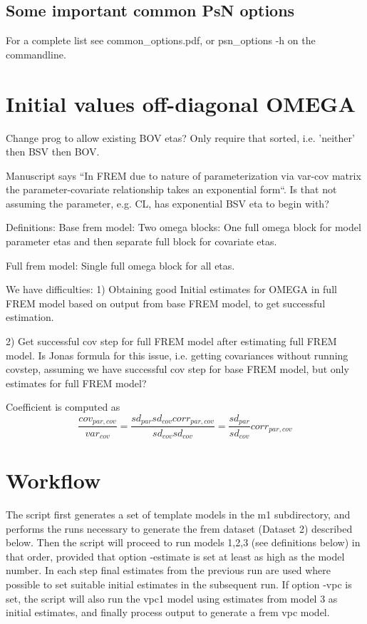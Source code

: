 \subsection{Some important common PsN options}
For a complete list see common\_options.pdf, 
or psn\_options -h on the commandline.


\section{Initial values off-diagonal OMEGA}

Change prog to allow existing BOV etas? Only require that sorted, i.e. 'neither' then BSV then BOV.


Manuscript says ``In FREM due to nature of parameterization via var-cov matrix the parameter-covariate
relationship
takes an exponential form``. Is that not assuming the parameter, e.g. CL, has exponential BSV eta to begin with?

Definitions:
Base frem model: Two omega blocks: One full omega block for model parameter etas and then separate full block for
covariate etas.

Full frem model: Single full omega block for all etas.

We have difficulties:
1) Obtaining good Initial estimates for OMEGA in full FREM model based on output from base FREM model,
to get successful estimation.

2) Get successful cov step for full FREM model after estimating full FREM model.
Is Jonas formula for this issue, i.e. getting covariances without running covstep, assuming we have
successful cov step for base FREM model, but only estimates for full FREM model?


Coefficient is computed as
\[
\frac{cov_{par,cov}}{var_{cov}}=\frac{sd_{par}sd_{cov}corr_{par,cov}}{sd_{cov}sd_{cov}}=\frac{sd_{par}}{sd_{cov}}corr_{par,cov}
\]

\section{Workflow}
The script first generates a set of template models in the m1 subdirectory, and performs the runs necessary to generate
the frem dataset (Dataset 2) described below. Then the script will proceed to run models 1,2,3 (see definitions below) 
in that order, provided
that option -estimate is set at least as high as the model number. In each step final estimates from the previous run are
used where possible to set suitable initial estimates in the subsequent run. If option -vpc is set, the script will also 
run the vpc1 model using estimates from model 3 as initial estimates, and finally process output to generate a frem vpc model.

